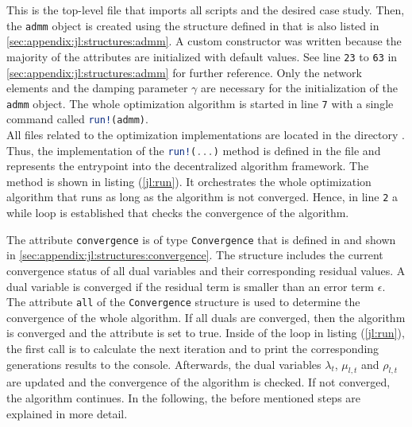 This is the top-level file that imports all scripts and the desired case study. Then, the \lstinline[language=julia]{admm} object is created using the structure defined in  that is also listed in \ref{sec:appendix:jl:structures:admm}. A custom constructor was written because the majority of the attributes are initialized with default values. See line \texttt{23} to \texttt{63} in \ref{sec:appendix:jl:structures:admm} for further reference. Only the network elements and the damping parameter $\gamma$ are necessary for the initialization of the \lstinline[language=julia]{admm} object. The whole optimization algorithm is started  in line \texttt{7} with a single command called \lstinline[language=julia]{run!(admm)}.\\

All files related to the optimization implementations are located in the directory . Thus, the implementation of the \lstinline[language=julia]{run!(...)} method is defined in the file  and represents the entrypoint into the decentralized algorithm framework. The method is shown in listing (\ref{jl:run}). It orchestrates the whole optimization algorithm that runs as long as the algorithm is not converged. Hence, in line \texttt{2} a while loop is established that checks the convergence of the algorithm.



The attribute \lstinline[language=julia]{convergence} is of type \lstinline[language=julia]{Convergence} that is defined in  and shown in \ref{sec:appendix:jl:structures:convergence}. The structure includes the current convergence status of all dual variables and their corresponding residual values. A dual variable is converged if the residual term is smaller than an error term $\epsilon$. The attribute \lstinline[language=julia]{all} of the \lstinline[language=julia]{Convergence} structure is used to determine the convergence of the whole algorithm. If all duals are converged, then the algorithm is converged and the attribute is set to true. Inside of the loop in listing (\ref{jl:run}), the first call is to calculate the next iteration and to print the corresponding generations results to the console. Afterwards, the dual variables $\lambda_{t}$, $\mu_{l,t}$ and $\rho_{l,t}$ are updated and the convergence of the algorithm is checked. If not converged, the algorithm continues. In the following, the before mentioned steps are explained in more detail.

